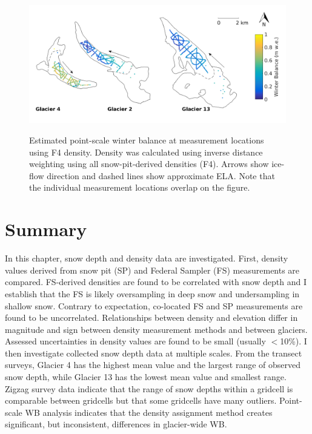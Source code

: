 \documentclass{sfuthesis}
\begin{document}
\begin{figure}[H]
	\centering
	\includegraphics[width =\textwidth]{SWEmap_opt9.png}\\
	\caption[Estimated point-scale winter balance at measurement locations using F4 density]{Estimated point-scale winter balance at measurement locations using F4 density. Density was calculated using inverse distance weighting using all snow-pit-derived densities (F4). Arrows show ice-flow direction and dashed lines show approximate ELA. Note that the individual measurement locations overlap on the figure.}
	\label{fig:SWEmap_F4}
\end{figure}


\section{Summary}

In this chapter, snow depth and density data are investigated. First, density values derived from snow pit (SP) and Federal Sampler (FS) measurements are compared. FS-derived densities are found to be correlated with snow depth and I establish that the FS is likely oversampling in deep snow and undersampling in shallow snow. Contrary to expectation, co-located FS and SP measurements are found to be uncorrelated. Relationships between density and elevation differ in magnitude and sign between density measurement methods and between glaciers. Assessed uncertainties in density values are found to be small (usually $<$10\%). I then investigate collected snow depth data at multiple scales. From the transect surveys, Glacier 4 has the highest mean value and the largest range of observed snow depth, while Glacier 13 has the lowest mean value and smallest range. Zigzag survey data indicate that the range of snow depths within a gridcell is comparable between gridcells but that some gridcells have many outliers. Point-scale WB analysis indicates that the density assignment method creates significant, but inconsistent, differences in glacier-wide WB. 
\end{document}
